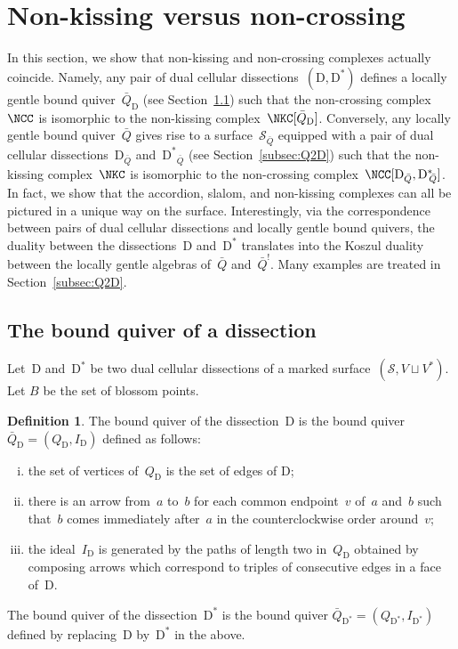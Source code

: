 \documentclass{amsart}
\theoremstyle{definition}
\newtheorem{definition}[theorem]{Definition}
\newcommand{\surface}{\mathcal{S}} %
\newcommand{\dual}{^*} %
\newcommand{\dissection}{\mathrm{D}} %
\newcommand{\koszul}{^!} %
\begin{document}
\section{Non-kissing versus non-crossing}

In this section, we show that non-kissing and non-crossing complexes actually coincide.
Namely, any pair of dual cellular dissections~$(\dissection, \dissection\dual)$ defines a locally gentle bound quiver~$\bar Q_{\dissection}$ (see Section~\ref{subsec:D2Q}) such that the non-crossing complex~$\NCC$ is isomorphic to the non-kissing complex~$\NKC[\bar Q_{\dissection}]$.
Conversely, any locally gentle bound quiver~$\bar Q$ gives rise to a surface~$\surface_{\bar Q}$ equipped with a pair of dual cellular dissections~$\dissection_{\bar Q}$ and~${{\dissection\dual}\!\!_{\bar Q}}$ (see Section~\ref{subsec:Q2D}) such that the non-kissing complex~$\NKC$ is isomorphic to the non-crossing complex~$\NCC[\dissection_{\bar Q}, {\dissection\dual\!\!_{\bar Q}}]$.
In fact, we show that the accordion, slalom, and non-kissing complexes can all be pictured in a unique way on the surface.
Interestingly, via the correspondence between pairs of dual cellular dissections and locally gentle bound quivers, the duality between the dissections~$\dissection$ and~$\dissection\dual$ translates into the Koszul duality between the locally gentle algebras of~$\bar Q$ and~$\bar Q\koszul$.
Many examples are treated in Section~\ref{subsec:Q2D}.

\subsection{The bound quiver of a dissection}
\label{subsec:D2Q}

Let~$\dissection$ and~$\dissection\dual$ be two dual cellular dissections of a marked surface~$(\surface, V\sqcup V\dual)$.
Let $B$ be the set of blossom points.

\begin{definition}
\label{def:quiverDualDissections}
The bound quiver of the dissection~$\dissection$ is the bound quiver $\bar Q_{\dissection} = (Q_{\dissection}, I_{\dissection})$ defined as follows:
\begin{enumerate}[(i)]
 \item the set of vertices of~$Q_{\dissection}$ is the set of edges of $\dissection$;
 \item there is an arrow from~$a$ to~$b$ for each common endpoint~$v$ of~$a$ and~$b$ such that~$b$ comes immediately after~$a$ in the counterclockwise order around~$v$;
 \item the ideal~$I_{\dissection}$ is generated by the paths of length two in~$Q_{\dissection}$ obtained by composing arrows which correspond to triples of consecutive edges in a face of~$\dissection$.
\end{enumerate}
The bound quiver of the dissection~$\dissection\dual$ is the bound quiver $\bar Q_{\dissection\dual} = (Q_{\dissection\dual}, I_{\dissection\dual})$ defined by replacing~$\dissection$ by~$\dissection\dual$ in the above.
\end{definition}
\end{document}
